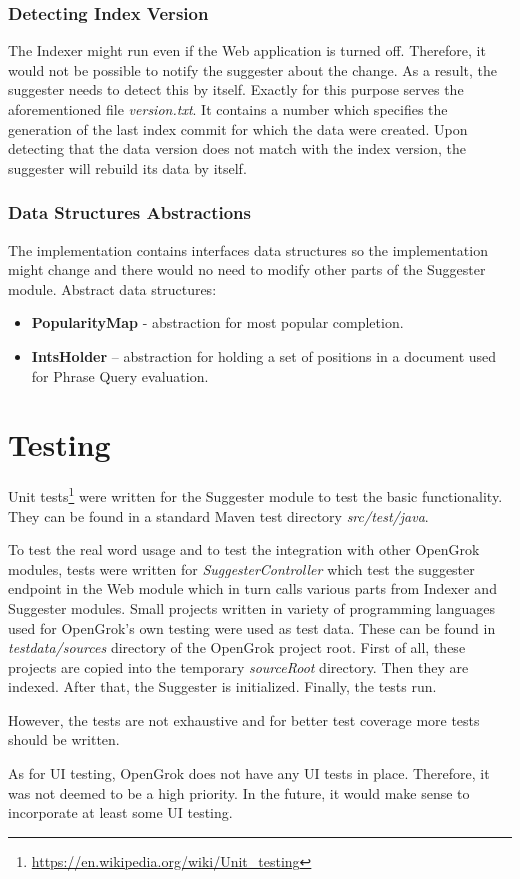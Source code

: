 \subsubsection{Detecting Index Version}
The Indexer might run even if the Web application is turned off. Therefore, it would not be possible to notify the
suggester about the change. As a result, the suggester needs to detect this by itself. Exactly for this purpose serves the
aforementioned file \textit{version.txt}. It contains a number which specifies the generation of the last index commit
for which the data were created.
Upon detecting that the data version does not match with the index version, the suggester will rebuild its data by itself.

\subsubsection{Data Structures Abstractions}
The implementation contains interfaces data structures so the implementation might change and there would no need to
modify other parts of the Suggester module. Abstract data structures:
\begin{itemize}
    \item \textbf{PopularityMap} - abstraction for most popular completion.
    \item \textbf{IntsHolder} – abstraction for holding a set of positions in a document used for Phrase Query evaluation.
\end{itemize}

\section{Testing}
Unit tests\footnote{\url{https://en.wikipedia.org/wiki/Unit_testing}} were written for the Suggester module to test
the basic functionality. They can be found in a standard Maven test directory \textit{src/test/java}.

To test the real word usage and to test the integration with other OpenGrok modules,
tests were written for \textit{SuggesterController} which test the
suggester endpoint in the Web module which in turn calls various parts from Indexer and Suggester modules.
Small projects written in variety of programming languages used for OpenGrok's own testing were used as test data.
These can be found in \textit{testdata/sources} directory of the OpenGrok project root.
First of all, these projects are copied into the temporary \textit{sourceRoot} directory. Then they are indexed.
After that, the Suggester is initialized. Finally, the tests run.

However, the tests are not exhaustive and for better test coverage more tests should be written.

As for UI testing, OpenGrok does not have any UI tests in place. Therefore, it was not deemed to be a high priority.
In the future, it would make sense to incorporate at least some UI testing.